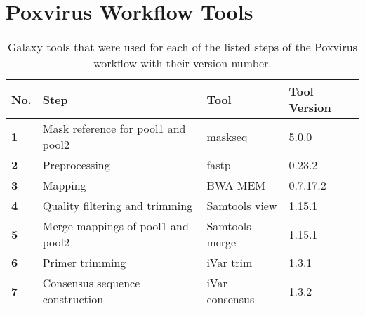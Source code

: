 \newpage
\section*{Poxvirus Workflow Tools}
\renewcommand{\arraystretch}{1.4}
\begin{table}[ht!]
	\begin{tabular}{llll}
	\hline
	\textbf{No.} & \textbf{Step}                      & \textbf{Tool}  & \textbf{Tool Version} \\ \hline \hline
	\textbf{1}   & Mask reference for pool1 and pool2 & maskseq        & 5.0.0                 \\
	\textbf{2}   & Preprocessing                      & fastp          & 0.23.2                \\
	\textbf{3}   & Mapping                            & BWA-MEM        & 0.7.17.2              \\
	\textbf{4}   & Quality filtering and trimming     & Samtools view  & 1.15.1                \\
	\textbf{5}   & Merge mappings of pool1 and pool2  & Samtools merge & 1.15.1                \\
	\textbf{6}   & Primer trimming                    & iVar trim      & 1.3.1                 \\
	\textbf{7}   & Consensus sequence construction    & iVar consensus & 1.3.2                 \\ \hline 
	\end{tabular}
	\caption{Galaxy tools that were used for each of the listed steps of the Poxvirus workflow with their version number.}
	\label{tab:pox-tools-steps}
\end{table}
